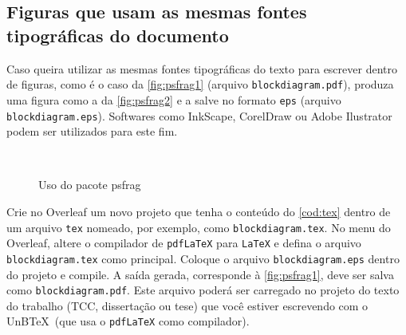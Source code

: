
\subsection{Figuras que usam as mesmas fontes tipográficas do documento}

Caso queira utilizar as mesmas fontes tipográficas do texto para escrever dentro de figuras, como é o caso da \cref{fig:psfrag1} (arquivo \texttt{blockdiagram.pdf}), produza uma figura como a da \cref{fig:psfrag2} e a salve no formato \texttt{eps} (arquivo \texttt{blockdiagram.eps}). Softwares como InkScape, CorelDraw ou Adobe Ilustrator podem ser utilizados para este fim.

\begin{figure}[htb]
    \centering
    \caption{Uso do pacote \textsf{psfrag}}
      \\
    \label{fig:psgrag}
\end{figure}

Crie no Overleaf um novo projeto que tenha o conteúdo do \cref{cod:tex} dentro de um arquivo \texttt{tex} nomeado, por exemplo, como \texttt{blockdiagram.tex}. No menu do Overleaf, altere o compilador de \texttt{pdfLaTeX} para \texttt{LaTeX} e defina o arquivo \texttt{blockdiagram.tex} como principal. Coloque o arquivo \texttt{blockdiagram.eps} dentro do projeto e compile. A saída gerada, corresponde à \cref{fig:psfrag1}, deve ser salva como \texttt{blockdiagram.pdf}. Este arquivo poderá ser carregado no projeto do texto do trabalho (TCC, dissertação ou tese) que você estiver escrevendo com o UnB\TeX\ (que usa o \texttt{pdfLaTeX} como compilador).

